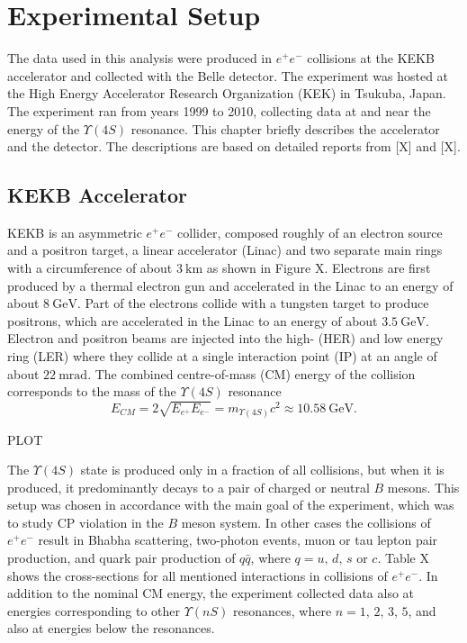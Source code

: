 \documentclass[headings=standardclasses,headings=big,oneside,a4paper,openany,12pt]{scrbook}
\newcommand {\e}[1]{\mathrm{~#1}}
\begin{document}
\chapter{Experimental Setup}
The data used in this analysis were produced in $e^+e^-$ collisions at the KEKB accelerator and collected with the Belle detector. The experiment was hosted at the High Energy Accelerator Research Organization (KEK) in Tsukuba, Japan. The experiment ran
from years 1999 to 2010, collecting data at and near the energy of the $\Upsilon(4S)$ resonance. This chapter briefly describes the accelerator and the detector. The descriptions are based on detailed reports from [X] and [X].


\section{KEKB Accelerator}
KEKB is an asymmetric $e^+e^-$ collider, composed roughly of an electron source and a positron target, a linear accelerator (Linac) and two separate main rings with a circumference of about $3\e{km}$ as shown in Figure X. Electrons are first produced by a thermal electron gun and accelerated in the Linac to an energy of about $8\e{GeV}$. Part of the electrons collide with a tungsten target to produce positrons, which are accelerated in the Linac to an energy of about $3.5\e{GeV}$. Electron and positron beams are injected into the high- (HER) and low energy ring (LER) where they collide at a single interaction point (IP) at an angle of about $22\e{mrad}$. The combined centre-of-mass (CM) energy of the collision corresponds to the mass of the $\Upsilon(4S)$ resonance
\begin{equation}
E_{CM} = 2\sqrt{E_{e^+}E_{e^-}} = m_{\Upsilon(4S)}c^2 \approx 10.58\e{GeV}.
\end{equation}

PLOT

The $\Upsilon(4S)$ state is produced only in a fraction of all collisions, but when it is produced, it predominantly decays to a pair of charged or neutral $B$ mesons. This setup was chosen in accordance with the main goal of the experiment, which was to study CP
violation in the $B$ meson system. In other cases the collisions of $e^+e^-$ result in Bhabha scattering, two-photon events, muon or tau lepton pair production, and quark pair production of $q \bar q$, where $q=u,\,d,\,s$ or $c$. Table X shows the cross-sections for all mentioned interactions in collisions of $e^+e^-$.
In addition to the nominal CM energy, the experiment collected data also at energies
corresponding to other $\Upsilon(nS)$ resonances, where $n = 1,\,2,\,3,\,5$, and also at energies below the resonances.
\end{document}
